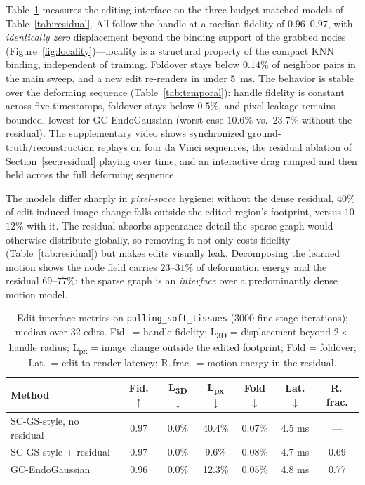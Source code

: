 \documentclass[AMA,Times1COL]{WileyNJDv5} %
\begin{document}
Table~\ref{tab:edit} measures the editing interface on the three budget-matched models of Table~\ref{tab:residual}. All follow the handle at a median fidelity of $0.96$--$0.97$, with \emph{identically zero} displacement beyond the binding support of the grabbed nodes (Figure~\ref{fig:locality})---locality is a structural property of the compact KNN binding, independent of training. Foldover stays below $0.14\%$ of neighbor pairs in the main sweep, and a new edit re-renders in under 5~ms. The behavior is stable over the deforming sequence (Table~\ref{tab:temporal}): handle fidelity is constant across five timestamps, foldover stays below $0.5\%$, and pixel leakage remains bounded, lowest for GC-EndoGaussian (worst-case $10.6\%$ vs.\ $23.7\%$ without the residual). The supplementary video shows synchronized ground-truth/reconstruction replays on four da Vinci sequences, the residual ablation of Section~\ref{sec:residual} playing over time, and an interactive drag ramped and then held across the full deforming sequence.

The models differ sharply in \emph{pixel-space} hygiene: without the dense residual, $40\%$ of edit-induced image change falls outside the edited region's footprint, versus $10$--$12\%$ with it. The residual absorbs appearance detail the sparse graph would otherwise distribute globally, so removing it not only costs fidelity (Table~\ref{tab:residual}) but makes edits visually leak. Decomposing the learned motion shows the node field carries $23$--$31\%$ of deformation energy and the residual $69$--$77\%$: the sparse graph is an \emph{interface} over a predominantly dense motion model.

\begin{table}[t]%
\centering
\caption{Edit-interface metrics on \texttt{pulling\_soft\_tissues} (3000 fine-stage iterations); median over 32 edits. Fid.\ = handle fidelity; L\textsubscript{3D} = displacement beyond $2\times$ handle radius; L\textsubscript{px} = image change outside the edited footprint; Fold = foldover; Lat.\ = edit-to-render latency; R.\,frac.\ = motion energy in the residual.\label{tab:edit}}%
\begin{tabular*}{\columnwidth}{@{\extracolsep\fill}lcccccc@{\extracolsep\fill}}
\toprule
\textbf{Method} & \textbf{Fid.}$\uparrow$ & \textbf{L\textsubscript{3D}}$\downarrow$ & \textbf{L\textsubscript{px}}$\downarrow$ & \textbf{Fold}$\downarrow$ & \textbf{Lat.}$\downarrow$ & \textbf{R.\,frac.} \\
\midrule
SC-GS-style, no residual & 0.97 & 0.0\% & 40.4\% & 0.07\% & 4.5 ms & --- \\
SC-GS-style + residual   & 0.97 & 0.0\% & \phantom{0}9.6\% & 0.08\% & 4.7 ms & 0.69 \\
GC-EndoGaussian          & 0.96 & 0.0\% & 12.3\% & 0.05\% & 4.8 ms & 0.77 \\
\bottomrule
\end{tabular*}
\end{table}
\end{document}
